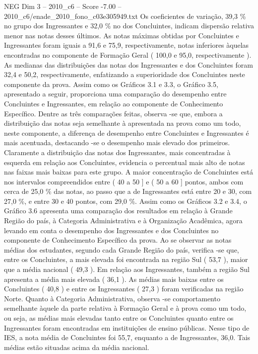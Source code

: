 \begin{textsample}{NEG Dim 3 – 2010\_c6 – Score -7.00 – 2010\_c6/enade\_2010\_fono\_c03e305949.txt}
Os coeficientes de variação, 39,3 \% no grupo dos Ingressantes e 32,0 \% no dos Concluintes, indicam dispersão relativa menor nas notas desses últimos.
As notas máximas obtidas por Concluintes e Ingressantes foram iguais a 91,6 e 75,9, respectivamente, notas inferiores àquelas encontradas no componente de Formação Geral ( 100,0 e 95,0, respectivamente ).
As medianas das distribuições das notas dos Ingressantes e dos Concluintes foram 32,4 e 50,2, respectivamente, enfatizando a superioridade dos Concluintes neste componente da prova.
Assim como os Gráficos 3.1 e 3.3, o Gráfico 3.5, apresentado a seguir, proporciona uma comparação do desempenho entre Concluintes e Ingressantes, em relação ao componente de Conhecimento Específico.
Dentre as três comparações feitas, observa -se que, embora a distribuição das notas seja semelhante à apresentada na prova como um todo, neste componente, a diferença de desempenho entre Concluintes e Ingressantes é mais acentuada, destacando -se o desempenho mais elevado dos primeiros.
Claramente a distribuição das notas dos Ingressantes, mais concentradas à esquerda em relação aos Concluintes, evidencia o percentual mais alto de notas nas faixas mais baixas para este grupo.
A maior concentração de Concluintes está nos intervalos compreendidos entre ( 40 a 50 ] e ( 50 a 60 ] pontos, ambos com cerca de 25,0 \% das notas, ao passo que a de Ingressantes está entre 20 e 30, com 27,0 \%, e entre 30 e 40 pontos, com 29,0 \%.
Assim como os Gráficos 3.2 e 3.4, o Gráfico 3.6 apresenta uma comparação dos resultados em relação à Grande Região do país, à Categoria Administrativa e à Organização Acadêmica, agora levando em conta o desempenho dos Ingressantes e dos Concluintes no componente de Conhecimento Específico da prova.
Ao se observar as notas médias dos estudantes, segundo cada Grande Região do país, verifica -se que, entre os Concluintes, a mais elevada foi encontrada na região Sul ( 53,7 ), maior que a média nacional ( 49,3 ).
Em relação aos Ingressantes, também a região Sul apresenta a média mais elevada ( 36,1 ).
As médias mais baixas entre os Concluintes ( 40,8 ) e entre os Ingressantes ( 27,3 ) foram verificadas na região Norte.
Quanto à Categoria Administrativa, observa -se comportamento semelhante àquele da parte relativa à Formação Geral e à prova como um todo, ou seja, as médias mais elevadas tanto entre os Concluintes quanto entre os Ingressantes foram encontradas em instituições de ensino públicas.
Nesse tipo de IES, a nota média de Concluintes foi 55,7, enquanto a de Ingressantes, 36,0.
Tais médias estão situadas acima da média nacional.

\end{textsample}
